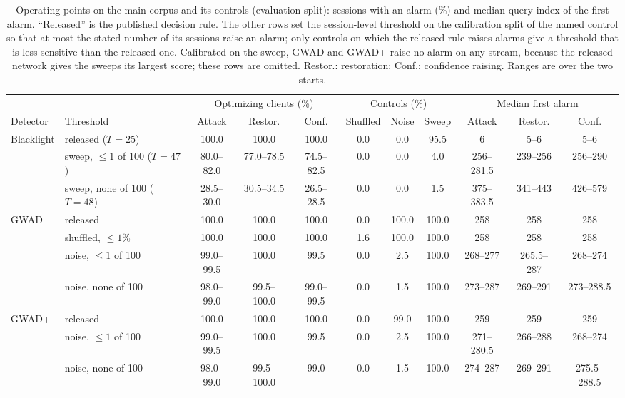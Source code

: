 \begin{table}
\centering\small\setlength{\tabcolsep}{5pt}
\caption{Operating points on the main corpus and its controls (evaluation split): sessions with an alarm (\%) and median query index of the first alarm. ``Released'' is the published decision rule. The other rows set the session-level threshold on the calibration split of the named control so that at most the stated number of its sessions raise an alarm; only controls on which the released rule raises alarms give a threshold that is less sensitive than the released one. Calibrated on the sweep, GWAD and GWAD+ raise no alarm on any stream, because the released network gives the sweeps its largest score; these rows are omitted. Restor.: restoration; Conf.: confidence raising. Ranges are over the two starts.}
\label{tab:operating}
\vspace{3pt}
\begin{adjustbox}{max width=\textheight}
\begin{tabular}{llccccccccc}
\toprule
& & \multicolumn{3}{c}{Optimizing clients (\%)} & \multicolumn{3}{c}{Controls (\%)} & \multicolumn{3}{c}{Median first alarm} \\
\cmidrule(lr){3-5}\cmidrule(lr){6-8}\cmidrule(lr){9-11}
Detector & Threshold & Attack & Restor. & Conf. & Shuffled & Noise & Sweep & Attack & Restor. & Conf. \\
\midrule
Blacklight & released ($T=25$) & 100.0 & 100.0 & 100.0 & 0.0 & 0.0 & 95.5 & 6 & 5--6 & 5--6 \\
 & sweep, $\le1$ of 100 ($T=47$) & 80.0--82.0 & 77.0--78.5 & 74.5--82.5 & 0.0 & 0.0 & 4.0 & 256--281.5 & 239--256 & 256--290 \\
 & sweep, none of 100 ($T=48$) & 28.5--30.0 & 30.5--34.5 & 26.5--28.5 & 0.0 & 0.0 & 1.5 & 375--383.5 & 341--443 & 426--579 \\[2pt]
GWAD & released & 100.0 & 100.0 & 100.0 & 0.0 & 100.0 & 100.0 & 258 & 258 & 258 \\
 & shuffled, $\le1\%$ & 100.0 & 100.0 & 100.0 & 1.6 & 100.0 & 100.0 & 258 & 258 & 258 \\
 & noise, $\le1$ of 100 & 99.0--99.5 & 100.0 & 99.5 & 0.0 & 2.5 & 100.0 & 268--277 & 265.5--287 & 268--274 \\
 & noise, none of 100 & 98.0--99.0 & 99.5--100.0 & 99.0--99.5 & 0.0 & 1.5 & 100.0 & 273--287 & 269--291 & 273--288.5 \\[2pt]
GWAD+ & released & 100.0 & 100.0 & 100.0 & 0.0 & 99.0 & 100.0 & 259 & 259 & 259 \\
 & noise, $\le1$ of 100 & 99.0--99.5 & 100.0 & 99.5 & 0.0 & 2.5 & 100.0 & 271--280.5 & 266--288 & 268--274 \\
 & noise, none of 100 & 98.0--99.0 & 99.5--100.0 & 99.0 & 0.0 & 1.5 & 100.0 & 274--287 & 269--291 & 275.5--288.5 \\
\bottomrule
\end{tabular}
\end{adjustbox}
\end{table}
